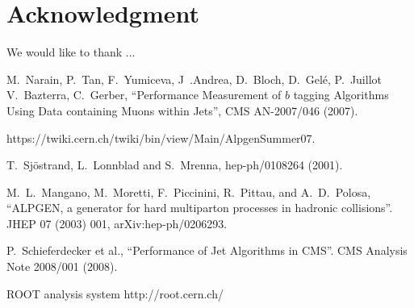 

\maketitle %

 
\setcounter{page}{2}
 

\label{sec:intro}



\label{sec:taggingalgos}


\label{sec:distributions}

\clearpage

\label{sec:system8}

\label{sec:avg_results}

\label{sec:binned_results}

\clearpage



\label{sec:conclusions}

\section{Acknowledgment} 
We would like to thank ...

\appendix

\begin{thebibliography}{99}

M.~Narain, P.~Tan, F.~Yumiceva, J~.Andrea, D.~Bloch, D.~Gel\'e, P.~Juillot
V.~Bazterra, C.~Gerber, ``Performance Measurement of $b$ tagging Algorithms Using Data containing Muons within Jets'', CMS AN-2007/046 (2007).

https://twiki.cern.ch/twiki/bin/view/Main/AlpgenSummer07.

T.~Sj{\"o}strand, L.~Lonnblad and S.~Mrenna, hep-ph/0108264 (2001).

M.~L.~Mangano, M.~Moretti, F.~Piccinini, R.~Pittau, and A.~D.~Polosa, ``ALPGEN, a generator for hard multiparton processes in hadronic collisions''. JHEP 07 (2003) 001, arXiv:hep-ph/0206293.

P.~Schieferdecker et al., ``Performance of Jet Algorithms in CMS''. CMS Analysis Note 2008/001 (2008).
 
ROOT analysis system 
http://root.cern.ch/

\end{thebibliography}
 
 


